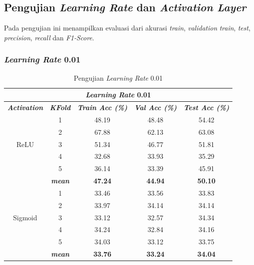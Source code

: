 \begin{table}[H]
    
        
\subsection{Pengujian \textit{Learning Rate} dan \textit{Activation Layer}}

    Pada pengujian ini menampilkan evaluasi dari akurasi \textit{train}, \textit{validation} \textit{train}, \textit{test}, \textit{precision}, \textit{recall} dan \textit{F1-Score}.

\subsubsection{\textit{Learning Rate} 0.01}

        \begin{table}[H]
        \centering
        \caption{Pengujian \textit{Learning Rate} 0.01 }
        \begin{tabular}{ccccc}
            \toprule
            \multicolumn{5}{c}{\textit{Learning Rate} 0.01} \\ \hline
            
            \textbf{\textit{Activation}} & \multicolumn{1}{c}{\textbf{\textit{KFold}}} & \textbf{\textit{Train Acc (\%)} } & \textbf{\textit{Val Acc (\%)}} & \textbf{\textit{Test Acc (\%)}}  \\
    
            \midrule
            \multirow{5}{*}{ReLU} 
            & 1 & 48.19 & 48.48 & 54.42  \\
            & 2 & 67.88 & 62.13 & 63.08 \\
            & 3 & 51.34 & 46.77 & 51.81 \\
            & 4 & 32.68 & 33.93 & 35.29 \\
            & 5 & 36.14 & 33.39 & 45.91 \\ 
            & \textbf{\textit{mean}}& \textbf{47.24 }& \textbf{44.94} & \textbf{50.10} \\ \hline

    
            \multirow{5}{*}{Sigmoid}
            & 1 & 33.46 & 33.56 & 33.83  \\
            & 2 & 33.97 & 34.14 & 34.14 \\
            & 3 & 33.12 & 32.57 & 34.34 \\
            & 4 & 34.24 & 32.84 & 34.16 \\
            & 5 & 34.03 & 33.12 & 33.75 \\
            & \textit{\textbf{mean}}& \textbf{33.76} & \textbf{33.24} &\textbf{34.04} \\ 
                        \hline
    

\end{tabular}
\end{table}
\end{table}
